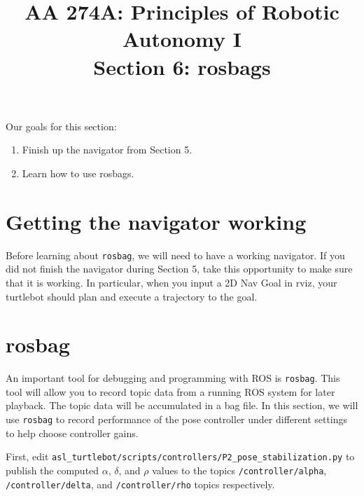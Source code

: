 \documentclass{article}
\title{AA 274A: Principles of Robotic Autonomy I \\Section 6: rosbags}
\date{}
\begin{document}
\maketitle
\pagestyle{fancy}
\vspace{-1.25cm}
Our goals for this section: 
\begin{enumerate}
    \item Finish up the navigator from Section 5.
    \item Learn how to use rosbags.
\end{enumerate}


\section{Getting the navigator working}
Before learning about \texttt{rosbag}, we will need to have a working navigator. If you did not finish the navigator during Section 5, take this opportunity to make sure that it is working. In particular, when you input a 2D Nav Goal in rviz, your turtlebot should plan and execute a trajectory to the goal.

\section{rosbag}
An important tool for debugging and programming with ROS is \texttt{rosbag}. This tool will allow you to record topic data from a running ROS system for later playback. The topic data will be accumulated in a bag file. In this section, we will use \texttt{rosbag} to record performance of the pose controller under different settings to help choose controller gains.

First, edit \texttt{asl\_turtlebot/scripts/controllers/P2\_pose\_stabilization.py} to publish the computed $\alpha$, $\delta$, and $\rho$ values to the topics \texttt{/controller/alpha}, \texttt{/controller/delta}, and \texttt{/controller/rho} topics respectively. 
\end{document}
